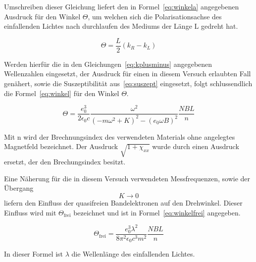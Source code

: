 Umschreiben dieser 
Gleichung liefert den in Formel~\eqref{eq:winkela} angegebenen 
Ausdruck für den Winkel $\Theta$, um welchen sich die 
Polarisationsachse des einfallenden Lichtes nach durchlaufen 
des Mediums der Länge L gedreht hat.

\begin{equation}
\Theta = \frac{L}{2}(k_R - k_L)
\label{eq:winkela}
\end{equation}

Werden hierfür die in den Gleichungen~\eqref{eq:kplusminus} 
angegebenen Wellenzahlen eingesetzt, der Ausdruck für einen in diesem 
Versuch erlaubten Fall genähert, sowie die Suszeptibilität 
aus~\eqref{eq:suszept} eingesetzt, folgt schlussendlich die 
Formel~\eqref{eq:winkel} für den Winkel $\Theta$. 

\begin{equation}
\Theta = \frac{e_0^3}{2\epsilon_0c}\frac{\omega^2}{(-m\omega^2 
+ K)^2 - (e_0\omega B)^2}
\frac{NBL}{n}
\label{eq:winkel}
\end{equation}

Mit n wird der Brechnungsindex des verwendeten Materials ohne 
angelegtes Magnetfeld bezeichnet. Der Ausdruck $\sqrt{1+\chi_{xx}}$ 
wurde durch einen Ausdruck ersetzt, der den Brechungsindex besitzt.

Eine Näherung für die in diesem Versuch verwendeten Messfrequenzen, 
sowie der Übergang
\begin{equation*}
K \rightarrow 0 
\end{equation*}
liefern den Einfluss der quasifreien Bandelektronen auf den 
Drehwinkel. Dieser Einfluss wird mit $\Theta_\text{frei}$ 
bezeichnet und ist in Formel~\eqref{eq:winkelfrei} angegeben.

\begin{equation}
\Theta_\text{frei} = \frac{e_0^3\lambda^2}{8\pi^2\epsilon_0c^3m^2}
\frac{NBL}{n}
\label{eq:winkelfrei}
\end{equation}

In dieser Formel ist $\lambda$ die Wellenlänge des einfallenden 
Lichtes.